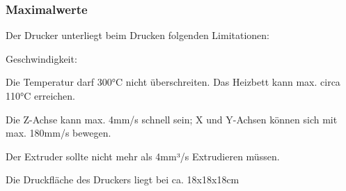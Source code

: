 \subsubsection{Maximalwerte}
Der Drucker unterliegt beim Drucken folgenden Limitationen:

\begin{labeling}{Geschwindigkeit:}
\item[Temperatur:] Die Temperatur darf 300°C nicht überschreiten. Das Heizbett kann max. circa 110°C erreichen.
\item[Geschwindigkeit:] Die Z-Achse kann max. 4mm/s schnell sein; X und Y-Achsen können sich mit max. 180mm/s bewegen.
\item[Extrusion:] Der Extruder sollte nicht mehr als 4mm³/s Extrudieren müssen.
\item[Druckfläche:] Die Druckfläche des Druckers liegt bei ca. 18x18x18cm
\end{labeling}